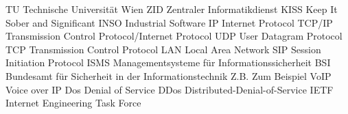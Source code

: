 	{TU}				{Technische Universit\"at Wien}
	{ZID}				{Zentraler Informatikdienst}
	{KISS}		{Keep It Sober and Significant}
 {INSO}		{Industrial Software}
 {IP}				{Internet Protocol}
 {TCP/IP}	{Transmission Control Protocol/Internet Protocol}
 {UDP}			{User Datagram Protocol}
 {TCP}			{Transmission Control Protocol}
 {LAN}			{Local Area Network}
 {SIP}			{Session Initiation Protocol}
 {ISMS} 		{Managementsysteme für Informationssicherheit}
 {BSI}			{Bundesamt für Sicherheit in der Informationstechnik}
 {Z.B.}			{Zum Beispiel}
 {VoIP}			{Voice over IP}
 {Dos}			{Denial of Service}
 {DDos}		{Distributed-Denial-of-Service}
 {IETF}			{Internet Engineering Task Force}
